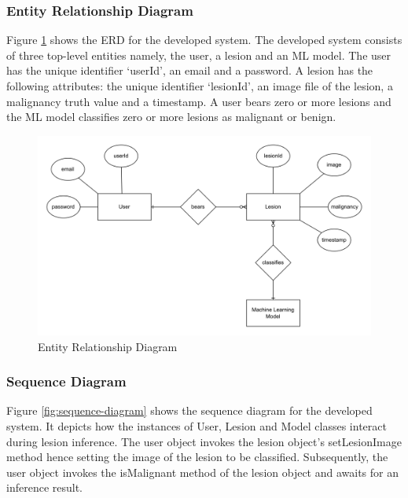 \documentclass[12pt, a4paper]{article}
\begin{document}
\subsubsection{Entity Relationship Diagram}
Figure \ref{fig:erd} shows the ERD for the developed system. The developed system consists of three top-level entities namely, the user, a lesion and an ML model. The user has the unique identifier `userId', an email and a password. A lesion has the following attributes: the unique identifier `lesionId', an image file of the lesion, a malignancy truth value and a timestamp. A user bears zero or more lesions and the ML model classifies zero or more lesions as malignant or benign.
\begin{figure}[h]
    \centering
    \setlength{\fboxsep}{8pt}
    \includegraphics[scale=0.115, fbox]{erd.png}
    \caption{Entity Relationship Diagram}
    \label{fig:erd}
\end{figure}
\subsubsection{Sequence Diagram}
Figure \ref{fig:sequence-diagram} shows the sequence diagram for the developed system. It depicts how the instances of User, Lesion and Model classes interact during lesion inference. The user object invokes the lesion object's setLesionImage method hence setting the image of the lesion to be classified. Subsequently, the user object invokes the isMalignant method of the lesion object and awaits for an inference result.
\end{document}
